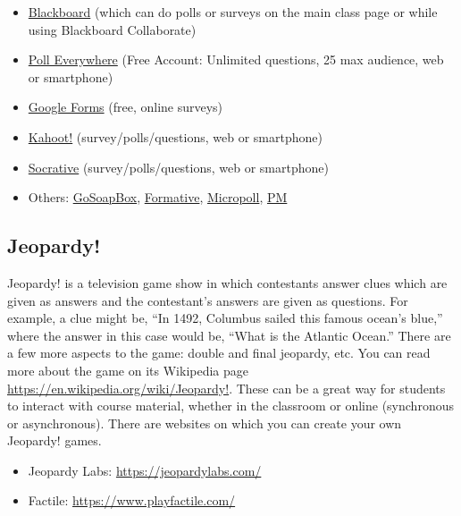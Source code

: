 	\begin{itemize}
	\item \href{https://help.blackboard.com/Learn/Instructor/Tests_Pools_Surveys}{Blackboard} (which can do polls or surveys on the main class page or while using Blackboard Collaborate)
	\item \href{https://www.polleverywhere.com/}{Poll Everywhere} (Free Account: Unlimited questions, 25 max audience, web or smartphone)
	\item \href{https://www.google.com/forms/about/}{Google Forms} (free, online surveys)
	\item \href{https://kahoot.com/}{Kahoot!} (survey/polls/questions, web or smartphone)
	\item \href{https://socrative.com/}{Socrative} (survey/polls/questions, web or smartphone)
	\item Others: \href{https://www.gosoapbox.com}{GoSoapBox}, \href{https://goformative.com}{Formative}, \href{http://www.micropoll.com}{Micropoll}, \href{https://www.poll-maker.com}{PM}
	\end{itemize}



\subsection{Jeopardy!}

Jeopardy! is a television game show in which contestants answer clues which are given as answers and the contestant's answers are given as questions. For example, a clue might be, ``In 1492, Columbus sailed this famous ocean's blue,'' where the answer in this case would be, ``What is the Atlantic Ocean.'' There are a few more aspects to the game: double and final jeopardy, etc. You can read more about the game on its Wikipedia page \url{https://en.wikipedia.org/wiki/Jeopardy!}. These can be a great way for students to interact with course material, whether in the classroom or online (synchronous or asynchronous). There are websites on which you can create your own Jeopardy! games. 

	\begin{itemize}
	\item Jeopardy Labs: \url{https://jeopardylabs.com/}
	\item Factile: \url{https://www.playfactile.com/}
	\end{itemize}



















